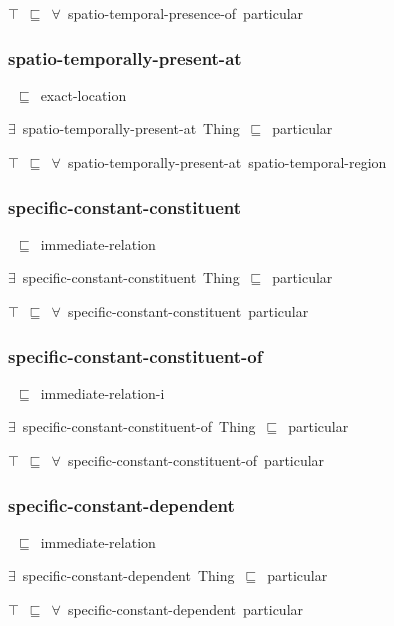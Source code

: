 \documentclass{article}
\begin{document}
\ensuremath{\top}~\ensuremath{\sqsubseteq}~\ensuremath{\forall}~spatio-temporal-presence-of~particular

\subsubsection*{spatio-temporally-present-at}

~\ensuremath{\sqsubseteq}~exact-location

\ensuremath{\exists}~spatio-temporally-present-at~Thing~\ensuremath{\sqsubseteq}~particular

\ensuremath{\top}~\ensuremath{\sqsubseteq}~\ensuremath{\forall}~spatio-temporally-present-at~spatio-temporal-region

\subsubsection*{specific-constant-constituent}

~\ensuremath{\sqsubseteq}~immediate-relation

\ensuremath{\exists}~specific-constant-constituent~Thing~\ensuremath{\sqsubseteq}~particular

\ensuremath{\top}~\ensuremath{\sqsubseteq}~\ensuremath{\forall}~specific-constant-constituent~particular

\subsubsection*{specific-constant-constituent-of}

~\ensuremath{\sqsubseteq}~immediate-relation-i

\ensuremath{\exists}~specific-constant-constituent-of~Thing~\ensuremath{\sqsubseteq}~particular

\ensuremath{\top}~\ensuremath{\sqsubseteq}~\ensuremath{\forall}~specific-constant-constituent-of~particular

\subsubsection*{specific-constant-dependent}

~\ensuremath{\sqsubseteq}~immediate-relation

\ensuremath{\exists}~specific-constant-dependent~Thing~\ensuremath{\sqsubseteq}~particular

\ensuremath{\top}~\ensuremath{\sqsubseteq}~\ensuremath{\forall}~specific-constant-dependent~particular
\end{document}

